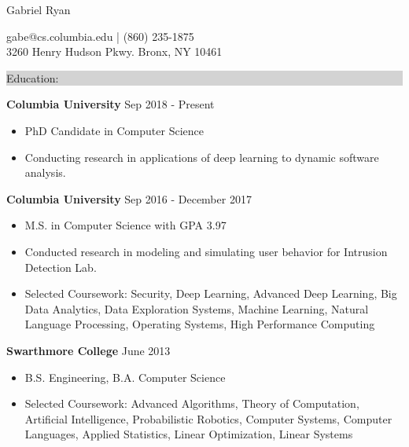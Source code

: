 \documentclass{article} %
\newcommand{\rsection}[1]{
\hspace{-0.4cm}
\colorbox{lightgrey}{
\begin{minipage}{1.07\linewidth}
\vspace{0.25cm}
\fontsize{14pt}{16pt}\selectfont #1 
\vspace{0.15cm}
\end{minipage}
}
\vspace*{-0.2cm}
}
\newcommand{\rjob}[2]{
\vspace{0.1cm}
\hspace*{-0.3cm}  
{\fontsize{10pt}{12pt}\selectfont #1} \hfill #2 
\vspace*{0.1cm} 
\hspace*{-1.2cm}
}
\newenvironment{ritemize}{
\hspace*{-0.8cm} 
\begin{minipage}{1.05\linewidth}
\begin{itemize}
}{
\end{itemize}
\end{minipage}
\vspace{-0.2cm}
}
\newcommand{\ritem}{
\item[-]
}
\begin{document}
\hspace*{-0.45cm} 
{\fontsize{22pt}{22pt}\selectfont Gabriel Ryan}\\
\hspace*{0.3cm} 
\begin{minipage}{\linewidth}
\vspace{0.1cm}
gabe@cs.columbia.edu | (860) 235-1875\\
3260 Henry Hudson Pkwy. Bronx, NY 10461
\end{minipage}
\vspace{-0.15cm}


\rsection{Education:} 

\rjob{\textbf{Columbia University}}{Sep 2018 - Present}\\
\begin{ritemize}
\ritem PhD Candidate in Computer Science
\ritem Conducting research in applications of deep learning to dynamic software analysis.
\end{ritemize}

\rjob{\textbf{Columbia University}}{Sep 2016 - December 2017}\\
\begin{ritemize}
\ritem M.S. in Computer Science with GPA 3.97
\ritem Conducted research in modeling and simulating user behavior for Intrusion Detection Lab.
\ritem Selected Coursework: Security, Deep Learning, Advanced Deep Learning, Big Data Analytics, Data Exploration Systems, Machine Learning, Natural Language Processing, Operating Systems, High Performance Computing
\end{ritemize}

\rjob{\textbf{Swarthmore College}}{June 2013}\\
\begin{ritemize}
\ritem B.S. Engineering, B.A. Computer Science
\ritem Selected Coursework: Advanced Algorithms, Theory of Computation, Artificial Intelligence, Probabilistic Robotics, Computer Systems, Computer Languages, Applied Statistics, Linear Optimization, Linear Systems
\end{ritemize}
\vspace{0.25cm}
\end{document}
